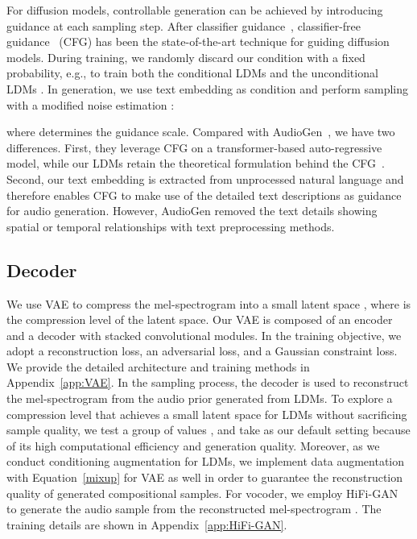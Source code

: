 \documentclass{article}
\begin{document}
For diffusion models, controllable generation can be achieved by introducing guidance at each sampling step. After classifier guidance~\cite{SGM,ImprovedDDPM}, classifier-free guidance~\cite{CFG,Glide} (CFG) has been the state-of-the-art technique for guiding diffusion models. During training, we randomly discard our condition  with a fixed probability, e.g.,  to train both the conditional LDMs  and the unconditional LDMs . In generation, we use text embedding  as condition and perform sampling with a modified noise estimation :

where  determines the guidance scale.
Compared with AudioGen~\cite{kreuk2022audiogen}, we have two differences. First, they leverage CFG on a transformer-based auto-regressive model, while our LDMs retain the theoretical formulation behind the CFG~\cite{CFG}. Second, our text embedding  is extracted from unprocessed natural language and therefore enables CFG to make use of the detailed text descriptions as guidance for audio generation. However, AudioGen removed the text details showing spatial or temporal relationships with text preprocessing methods. 

\subsection{Decoder}
\label{Decoder}

We use VAE to compress the mel-spectrogram  into a small latent space , where  is the compression level of the latent space. Our VAE is composed of an encoder and a decoder with stacked convolutional modules. In the training objective, we adopt a reconstruction loss, an adversarial loss, and a Gaussian constraint loss. We provide the detailed architecture and training methods in Appendix~\ref{app:VAE}. In the sampling process, the decoder is used to reconstruct the mel-spectrogram  from the audio prior  generated from LDMs. To explore a compression level  that achieves a small latent space for LDMs without sacrificing sample quality, we test a group of values , and take  as our default setting because of its high computational efficiency and generation quality. Moreover, as we conduct conditioning augmentation for LDMs, we implement data augmentation with Equation~\ref{mixup} for VAE as well in order to guarantee the reconstruction quality of generated compositional samples. For vocoder, we employ HiFi-GAN~\cite{kong2020hifi} to generate the audio sample  from the reconstructed mel-spectrogram . The training details are shown in Appendix~\ref{app:HiFi-GAN}.
\end{document}
